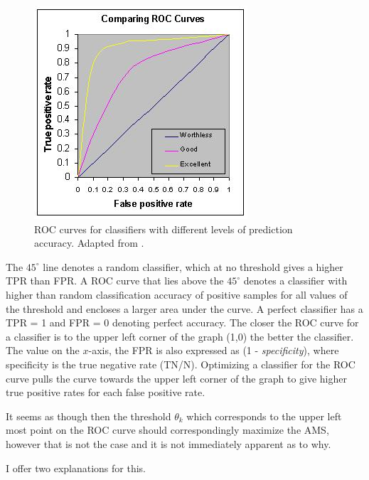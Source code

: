 \begin{figure}
\begin{center}
\includegraphics[scale=3]{images/Comparing_ROC.jpg}
\caption{ROC curves for classifiers with different levels of prediction accuracy. Adapted from \cite{roc}.}
\end{center}
\label{roc}
\end{figure}

The $45^\circ$ line denotes a random classifier, which at no threshold gives a higher TPR than FPR. A ROC curve that lies above the $45^\circ$ denotes a classifier with higher than random classification accuracy of positive samples for all values of the threshold and encloses a larger area under the curve. A perfect classifier has a TPR = 1 and FPR = 0 denoting perfect accuracy. The closer the ROC curve for a classifier is to the upper left corner of the graph (1,0) the better the classifier. The value on the $x$-axis, the FPR is also expressed as (1 - \textit{specificity}), where  specificity is the true negative rate (TN/N). Optimizing a classifier for the ROC curve pulls the curve towards the upper left corner of the graph to give higher true positive rates for each false positive rate.   

It seems as though then the threshold $\theta_{k}$ which corresponds to the upper left most point on the ROC curve should correspondingly maximize the AMS, however that is not the case and it is not immediately apparent as to why. 

I offer two explanations for this.

